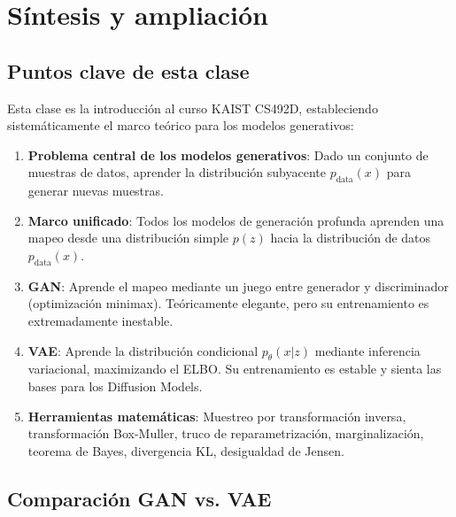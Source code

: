 \section{Síntesis y ampliación}

\subsection{Puntos clave de esta clase}

Esta clase es la introducción al curso KAIST CS492D, estableciendo sistemáticamente el marco teórico para los modelos generativos:

\begin{enumerate}
    \item \textbf{Problema central de los modelos generativos}: Dado un conjunto de muestras de datos, aprender la distribución subyacente $p_{\text{data}}(x)$ para generar nuevas muestras.
    \item \textbf{Marco unificado}: Todos los modelos de generación profunda aprenden una mapeo desde una distribución simple $p(z)$ hacia la distribución de datos $p_{\text{data}}(x)$.
    \item \textbf{GAN}: Aprende el mapeo mediante un juego entre generador y discriminador (optimización minimax). Teóricamente elegante, pero su entrenamiento es extremadamente inestable.
    \item \textbf{VAE}: Aprende la distribución condicional $p_\theta(x|z)$ mediante inferencia variacional, maximizando el ELBO. Su entrenamiento es estable y sienta las bases para los Diffusion Models.
    \item \textbf{Herramientas matemáticas}: Muestreo por transformación inversa, transformación Box-Muller, truco de reparametrización, marginalización, teorema de Bayes, divergencia KL, desigualdad de Jensen.
\end{enumerate}

\subsection{Comparación GAN vs. VAE}

